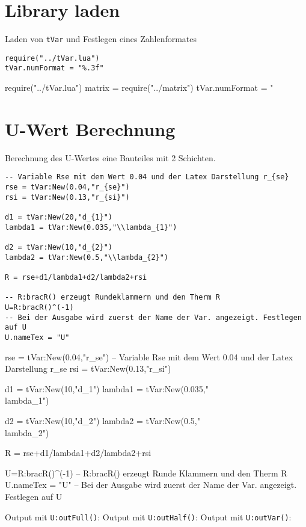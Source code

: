 


\section{Library laden}
Laden von \lstinline$tVar$ und Festlegen eines Zahlenformates
\begin{lstlisting}
require("../tVar.lua")
tVar.numFormat = "%.3f"
\end{lstlisting}
\begin{luacode*}
	require("../tVar.lua")
	matrix = require("../matrix")
	tVar.numFormat = "%
\end{luacode*}
\section{U-Wert Berechnung}
Berechnung des U-Wertes eine Bauteiles mit 2 Schichten.
\begin{lstlisting}
-- Variable Rse mit dem Wert 0.04 und der Latex Darstellung r_{se}
rse = tVar:New(0.04,"r_{se}")
rsi = tVar:New(0.13,"r_{si}") 
	
d1 = tVar:New(20,"d_{1}")
lambda1 = tVar:New(0.035,"\\lambda_{1}")
	
d2 = tVar:New(10,"d_{2}")
lambda2 = tVar:New(0.5,"\\lambda_{2}")
	
R = rse+d1/lambda1+d2/lambda2+rsi

-- R:bracR() erzeugt Rundeklammern und den Therm R
U=R:bracR()^(-1) 
-- Bei der Ausgabe wird zuerst der Name der Var. angezeigt. Festlegen auf U
U.nameTex = "U"
\end{lstlisting}
\begin{luacode*}
	rse = tVar:New(0.04,"r_{se}") -- Variable Rse mit dem Wert 0.04 und der Latex Darstellung r_{se}
	rsi = tVar:New(0.13,"r_{si}") 
	
	d1 = tVar:New(10,"d_{1}")
	lambda1 = tVar:New(0.035,"\\lambda_{1}")
	
	d2 = tVar:New(10,"d_{2}")
	lambda2 = tVar:New(0.5,"\\lambda_{2}")
	
	R = rse+d1/lambda1+d2/lambda2+rsi
	
	U=R:bracR()^(-1) -- R:bracR() erzeugt Runde Klammern und den Therm R
	U.nameTex = "U" -- Bei der Ausgabe wird zuerst der Name der Var. angezeigt. Festlegen auf U
\end{luacode*}
Output mit \lstinline{U:outFull()}:
Output mit \lstinline{U:outHalf()}:
Output mit \lstinline{U:outVar()}:
